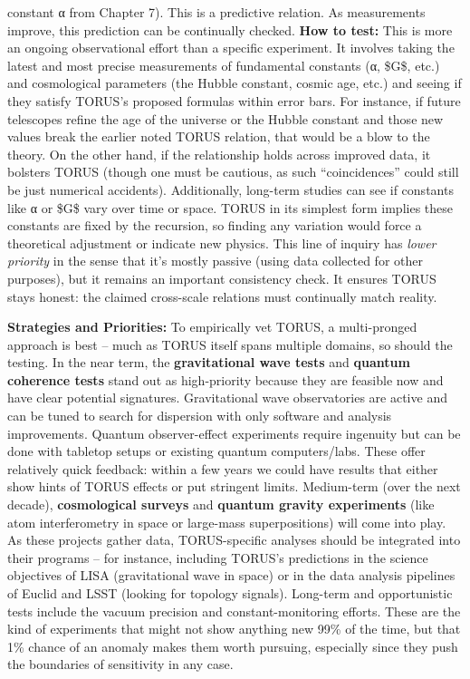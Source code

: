\begin{itemize}
  constant α from Chapter 7). This is a predictive relation. As
  measurements improve, this prediction can be continually checked.
  \textbf{How to test:} This is more an ongoing observational effort
  than a specific experiment. It involves taking the latest and most
  precise measurements of fundamental constants (α, \$G\$, etc.) and
  cosmological parameters (the Hubble constant, cosmic age, etc.) and
  seeing if they satisfy TORUS's proposed formulas within error bars​.
  For instance, if future telescopes refine the age of the universe or
  the Hubble constant and those new values break the earlier noted TORUS
  relation, that would be a blow to the theory. On the other hand, if
  the relationship holds across improved data, it bolsters TORUS (though
  one must be cautious, as such ``coincidences'' could still be just
  numerical accidents). Additionally, long-term studies can see if
  constants like α or \$G\$ vary over time or space. TORUS in its
  simplest form implies these constants are fixed by the recursion, so
  finding any variation would force a theoretical adjustment or indicate
  new physics. This line of inquiry has \emph{lower priority} in the
  sense that it's mostly passive (using data collected for other
  purposes)​, but it remains an important consistency check. It ensures
  TORUS stays honest: the claimed cross-scale relations must continually
  match reality.
\end{itemize}

\textbf{Strategies and Priorities:} To empirically vet TORUS, a
multi-pronged approach is best -- much as TORUS itself spans multiple
domains, so should the testing. In the near term, the
\textbf{gravitational wave tests} and \textbf{quantum coherence tests}
stand out as high-priority because they are feasible now and have clear
potential signatures​. Gravitational wave observatories are active and
can be tuned to search for dispersion with only software and analysis
improvements. Quantum observer-effect experiments require ingenuity but
can be done with tabletop setups or existing quantum computers/labs.
These offer relatively quick feedback: within a few years we could have
results that either show hints of TORUS effects or put stringent limits.
Medium-term (over the next decade), \textbf{cosmological surveys} and
\textbf{quantum gravity experiments} (like atom interferometry in space
or large-mass superpositions) will come into play​. As these projects
gather data, TORUS-specific analyses should be integrated into their
programs -- for instance, including TORUS's predictions in the science
objectives of LISA (gravitational wave in space) or in the data analysis
pipelines of Euclid and LSST (looking for topology signals). Long-term
and opportunistic tests include the vacuum precision and
constant-monitoring efforts​. These are the kind of experiments that
might not show anything new 99\% of the time, but that 1\% chance of an
anomaly makes them worth pursuing, especially since they push the
boundaries of sensitivity in any case.

